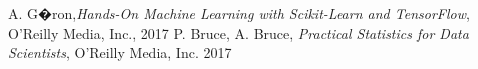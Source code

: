 \documentclass[nostrict]{PG-schema}
\begin{document}
\tableofcontents    %
\listoffigures      %









                      
\begin{thebibliography}{3}                      %
\small              %
A. G�ron,\emph{Hands-On Machine Learning with Scikit-Learn and TensorFlow}, O'Reilly Media, Inc., 2017
P. Bruce, A. Bruce, \emph{Practical Statistics for Data Scientists}, O'Reilly Media, Inc. 2017
\end{thebibliography}                 
\end{document}
